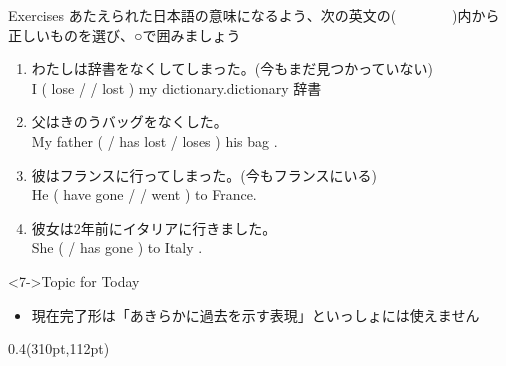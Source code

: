 \documentclass[aspectratio=169,xcolor={dvipsnames,table}]{beamer}
\newcommand{\myaudio}[1]{\href{#1}{\faVolumeUp}}
\begin{document}
\begin{frame}[plain]{Exercises}
 あたえられた日本語の意味になるよう、次の英文の(~~~~~~~~)内から正しいものを選び、○で囲みましょう%
\mbox{}\hfill{\scriptsize \myaudio{./audio/014_have_pp_kekka_05.mp3}}


\begin{enumerate}
 \item {\small わたしは辞書をなくしてしまった。}{\footnotesize (今もまだ見つかっていない)}\\
I  ( lose /  / lost ) my dictionary.\hfill{\scriptsize dictionary  辞書}
 \item {\small 父はきのうバッグをなくした。\textdbend}\\
My father (  / has lost / loses ) his bag .
 \item {\small 彼はフランスに行ってしまった。}{\footnotesize (今もフランスにいる)}\\
He ( have gone /  / went  ) to France.
 \item {\small 彼女は2年前にイタリアに行きました。\textdbend}\\
She (  / has gone ) to Italy .
\end{enumerate}

\begin{block}<7->{Topic for Today}\small
 \begin{itemize}[square]\small
 \item 現在完了形は「あきらかに過去を示す表現」といっしょには使えません\,\,\,\,\raisebox{-7pt}{\textdbend}
 \end{itemize}
\end{block}

\normalsize
\begin{textblock*}{0.4\linewidth}(310pt,112pt)
\end{textblock*}
\end{frame}
\end{document}
